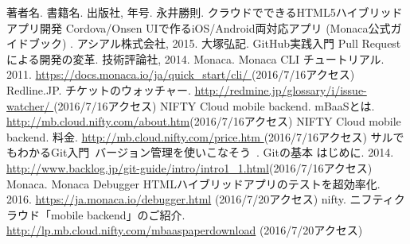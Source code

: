 \documentclass[openany,11pt,papersize]{jsbook}
\begin{document}
%
\maketitle

\frontmatter



\tableofcontents%


\mainmatter%



%















\begin{appendix}





\end{appendix}



\begin{thebibliography}{9}
 著者名. 書籍名. 出版社,  年号.
 永井勝則. クラウドでできるHTML5ハイブリッドアプリ開発 Cordova/Onsen UIで作るiOS/Android両対応アプリ (Monaca公式ガイドブック) . アシアル株式会社, 2015.
 大塚弘記. GitHub実践入門 Pull Requestによる開発の変革. 技術評論社, 2014.
 Monaca. Monaca CLI チュートリアル. 2011. \url{https://docs.monaca.io/ja/quick_start/cli/ }(2016/7/16アクセス)
 Redline.JP. チケットのウォッチャー. \url{http://redmine.jp/glossary/i/issue-watcher/ }(2016/7/16アクセス)
 NIFTY Cloud mobile backend. mBaaSとは. \url{http://mb.cloud.nifty.com/about.htm}(2016/7/16アクセス)
 NIFTY Cloud mobile backend. 料金. \url{http://mb.cloud.nifty.com/price.htm }(2016/7/16アクセス)
 サルでもわかるGit入門~バージョン管理を使いこなそう~. Gitの基本 はじめに. 2014. \url{http://www.backlog.jp/git-guide/intro/intro1_1.html}(2016/7/16アクセス)
 Monaca. Monaca Debugger HTMLハイブリッドアプリのテストを超効率化. 2016. \url{https://ja.monaca.io/debugger.html} (2016/7/20アクセス)
 nifty. ニフティクラウド「mobile backend」のご紹介. \url{http://lp.mb.cloud.nifty.com/mbaaspaperdownload} (2016/7/20アクセス)
\end{thebibliography}
\end{document}
